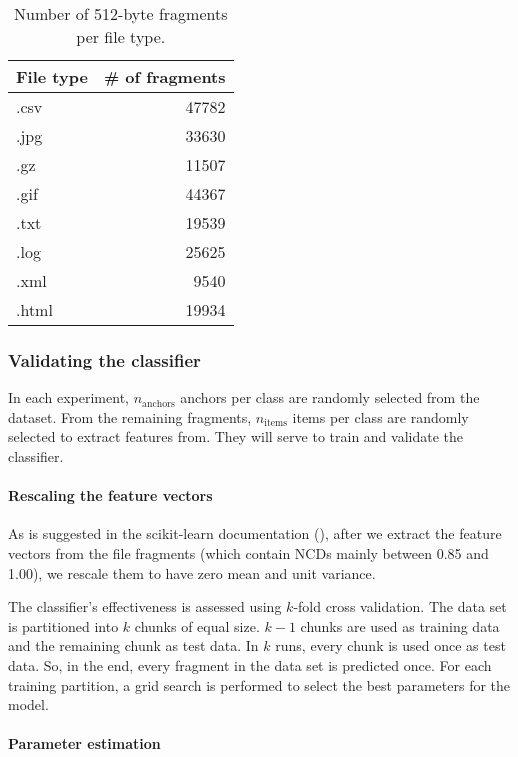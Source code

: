 \begin{table}
\begin{tabular}{lr}
\hline
 File type   &   \# of fragments \\
\hline
 .csv        &                 47782 \\
 .jpg        &                 33630 \\
 .gz         &                 11507 \\
 .gif        &                 44367 \\
 .txt        &                 19539 \\
 .log        &                 25625 \\
 .xml        &                 9540  \\
 .html       &                 19934  \\
\hline
\end{tabular}
\caption{Number of 512-byte fragments per file type.}
\label{table:number_of_fragments}
\end{table}


\subsubsection{Validating the classifier}

In each experiment, $n_{\text{anchors}}$ anchors per class are randomly selected from
the dataset. From the remaining fragments, $n_{\text{items}}$ items per
class are randomly selected to extract features from. They will serve to
train and validate the classifier.

\paragraph{Rescaling the feature vectors} As is suggested in the
scikit-learn documentation (\cite{Pedregosa2011}), after we extract the
feature vectors from the file fragments (which contain NCDs mainly between
0.85 and 1.00), we rescale them to have zero mean and unit variance.

The classifier's effectiveness is assessed using $k$-fold cross
validation. The data set is partitioned into $k$ chunks of equal size. $k
- 1$ chunks are used as training data and the remaining chunk as test
data. In $k$ runs, every chunk is used once as test data. So, in the end,
every fragment in the data set is predicted once. For each training
partition, a grid search is performed to select the best parameters for
the model.


\paragraph{Parameter estimation}

